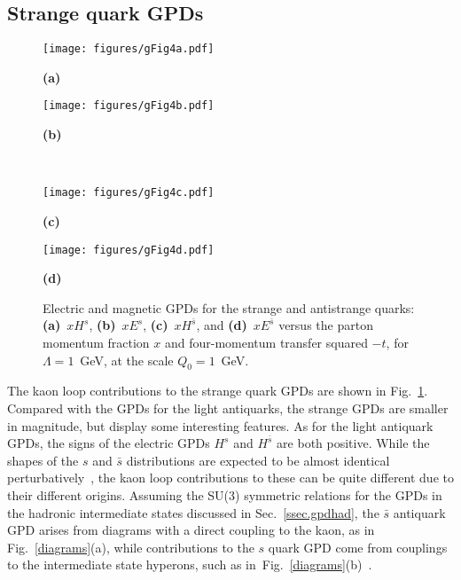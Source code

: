 \documentclass[preprintnumbers,prd,superscriptaddress,preprint]{revtex4-1}
\begin{document}
\subsection{Strange quark GPDs}

\begin{figure}[] %
\begin{center}
    \begin{minipage}{0.45\linewidth}
        \centering
        \centerline{
        \texttt{[image: figures/gFig4a.pdf]}
        }
        \centerline{\small{\bf{(a)}}}
    \end{minipage}
    \begin{minipage}{0.45\linewidth}
        \centering
        \centerline{
        \texttt{[image: figures/gFig4b.pdf]}
        }
        \centerline{\small{\bf{(b)}}}
    \end{minipage}    
\\[0.4cm]
        \begin{minipage}{0.45\linewidth}
        \centering
        \centerline{
        \texttt{[image: figures/gFig4c.pdf]}
        }
        \centerline{\small{\bf{(c)}}}
    \end{minipage}
        \begin{minipage}{0.45\linewidth}
        \centering
        \centerline{
        \texttt{[image: figures/gFig4d.pdf]}
        }
        \centerline{\small{\bf{(d)}}}
    \end{minipage}
\caption{Electric and magnetic GPDs for the strange and antistrange quarks: {\bf (a)}~$xH^s$, {\bf (b)}~$xE^s$, {\bf (c)}~$xH^{\bar{s}}$, and {\bf (d)}~$xE^{\bar{s}}$ versus the parton momentum fraction $x$ and four-momentum transfer squared $-t$, for $\Lambda=1$~GeV, at the scale $Q_0=1$~GeV.}
\label{3dssbar}
\end{center}
\end{figure}


The kaon loop contributions to the strange quark GPDs are shown in Fig.~\ref{3dssbar}.
Compared with the GPDs for the light antiquarks, the strange GPDs are smaller in magnitude, but display some interesting features.
As for the light antiquark GPDs, the signs of the electric GPDs $H^s$ and $H^{\bar{s}}$ are both positive.
While the shapes of the $s$ and $\bar{s}$ distributions are expected to be almost identical perturbatively~\cite{Catani:2004nc}, the kaon loop contributions to these can be quite different due to their different origins.
Assuming the SU(3) symmetric relations for the GPDs in the hadronic intermediate states discussed in Sec.~\ref{ssec.gpdhad}, the $\bar s$ antiquark GPD arises from diagrams with a direct coupling to the kaon, as in Fig.~\ref{diagrams}(a), while contributions to the $s$ quark GPD come from couplings to the intermediate state hyperons, such as in~Fig.~\ref{diagrams}(b)~\cite{Signal:1987gz, Melnitchouk:1996fj}.
\end{document}
